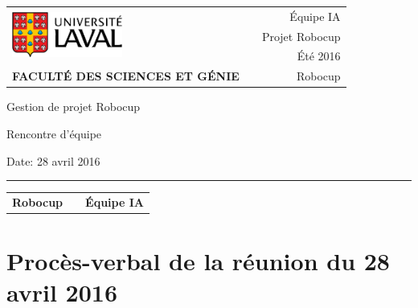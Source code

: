 \documentclass[12pt,letterpaper,twoside]{article}
\begin{document}
\setcounter{secnumdepth}{0}
\begin{titlepage}

        \vspace*{1cm}
        \begin{small}
        \begin{tabularx}{\textwidth}{ l X r }
        \multirow{3}{*}{\includegraphics[height=1.5cm,keepaspectratio]{ul_logo.pdf}}
        && \'Equipe IA\\
        && Projet Robocup\\
        && Été 2016\\

        \scriptsize{\textbf{FACULTÉ DES SCIENCES ET GÉNIE}} && Robocup
        \end{tabularx}
        \end{small}

        \vfill

        \begin{center}

        Gestion de projet Robocup

        \vspace{0.5cm}

        Rencontre d'\'equipe

        \vspace{2cm}

        \end{center}

        \vfill

        Date: 28 avril 2016

        \vspace{0.4cm}

        \rule{\textwidth}{2pt}

        \vspace{0.3cm}

        \begin{tabularx}{\textwidth}{ l X r }

        \textbf{Robocup} && \textbf{\'Equipe IA} \\

        \end{tabularx}


\end{titlepage}


\section*{Proc\`es-verbal de la réunion du 28 avril 2016}
\end{document}
